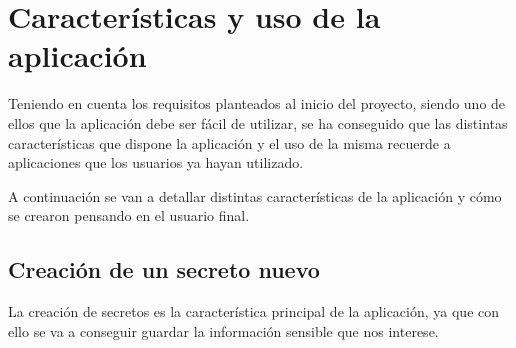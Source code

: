 \documentclass{\ClassPath/viu-tfm-template}
\begin{document}
\section{Características y uso de la aplicación}

Teniendo en cuenta los requisitos planteados al inicio del proyecto, siendo uno de ellos que la aplicación debe ser fácil de utilizar, se ha conseguido que las distintas características que dispone la aplicación y el uso de la misma recuerde a aplicaciones que los usuarios ya hayan utilizado.

A continuación se van a detallar distintas características de la aplicación y cómo se crearon pensando en el usuario final.


\subsection{Creación de un secreto nuevo}

La creación de secretos es la característica principal de la aplicación, ya que con ello se va a conseguir guardar la información sensible que nos interese.
\end{document}
